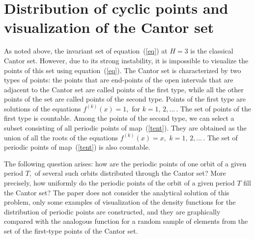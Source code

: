 \documentclass[12pt,a4paper]{amsart}
\begin{document}
\section{Distribution of cyclic points and visualization of the Cantor set} \label{sec:DistributionCyclicPoints}


As noted above, the invariant set of equation~(\ref{eq}) at $H=3$ is the classical Cantor set. However, due to its strong instability, it is impossible to visualize 
the points of this set using equation~(\ref{eq}). The Cantor set is characterized by two types of points: the points that are end-points of the open intervals that are adjacent 
to the Cantor set are called points of the first type, while all the other points of the set are called points of the second type. Points of the first type are solutions of the equations $f^{(k)}(x) = 1,$ for $k=1,\,2,\ldots\,$. The set of points of the first type is countable. Among the points of the second type, we can select
a subset consisting of all periodic points of map~(\ref{tent}). They are obtained as the union of all the roots of the equations $f^{(k)}(x) = x,$ $k=1,\,2,\ldots\,$. 
The set of periodic points of map~(\ref{tent}) is also countable.


The following question arises: how are the periodic points of one orbit of a given period $T,$ of several such orbits distributed through the Cantor set?  More precisely, how uniformly 
do the periodic points of the orbit of a given period $T$ fill the Cantor set? The paper does not consider the analytical solution of this problem, 
only some examples of visualization of the density functions for the distribution of periodic points are constructed, and they are graphically compared with 
the analogous function for a random sample of elements from the set of the first-type points of the Cantor set.
\end{document}
